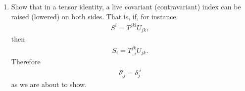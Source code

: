 \documentclass[12pt,a4paper]{report}
\begin{document}
\begin{enumerate}[label=\textbf{\arabic*.}]
\item Show that in a tensor identity, a live covariant (contravariant) index can be raised (lowered) on both sides.  That is, if, for instance
\begin{align*}
	S^i=T^{jkl}U_{jk},
\end{align*}then
\begin{align*}
	S_i = T^{jk}_{..i}U_{jk}.
\end{align*}Therefore 
\begin{align*}
	\delta^i_{.j}= \delta^{.i}_j
\end{align*}as we are about to show.

\end{enumerate}
\end{document}

